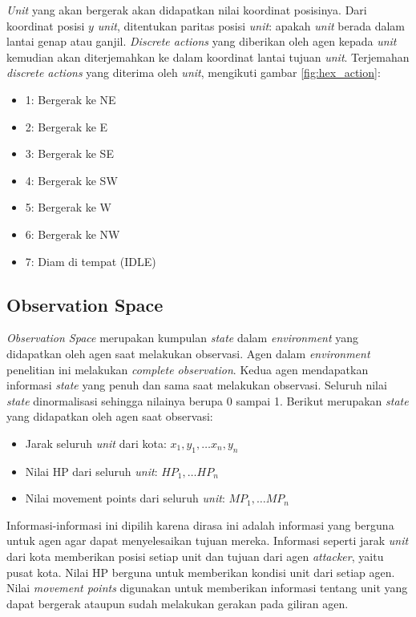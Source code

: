 \emph{Unit} yang akan bergerak akan didapatkan nilai koordinat posisinya.
Dari koordinat posisi $y$ \emph{unit}, ditentukan paritas posisi \emph{unit}: apakah \emph{unit} berada dalam lantai genap atau ganjil.
\emph{Discrete actions} yang diberikan oleh agen kepada \emph{unit} kemudian akan diterjemahkan ke dalam koordinat lantai tujuan \emph{unit}.
Terjemahan \emph{discrete actions} yang diterima oleh \emph{unit}, mengikuti gambar \ref{fig:hex_action}:

\begin{itemize}
  \item 1: Bergerak ke NE
  \item 2: Bergerak ke E
  \item 3: Bergerak ke SE
  \item 4: Bergerak ke SW
  \item 5: Bergerak ke W
  \item 6: Bergerak ke NW
  \item 7: Diam di tempat (IDLE)
\end{itemize}

\subsection{Observation Space}
\emph{Observation Space} merupakan kumpulan \emph{state} dalam \emph{environment} yang didapatkan oleh agen saat melakukan observasi.
Agen dalam \emph{environment} penelitian ini melakukan \emph{complete observation}. 
Kedua agen mendapatkan informasi \emph{state} yang penuh dan sama saat melakukan observasi.
Seluruh nilai \emph{state} dinormalisasi sehingga nilainya berupa 0 sampai 1.
Berikut merupakan \emph{state} yang didapatkan oleh agen saat observasi:
\begin{itemize}
  \item Jarak seluruh \emph{unit} dari kota: $x_{1}, y_{1}, \dots x_{n}, y_{n}$
  \item Nilai HP dari seluruh \emph{unit}: $HP_{1}, \dots HP_{n}$
  \item Nilai movement points dari seluruh \emph{unit}: $MP_{1}, \dots MP_{n}$
\end{itemize}

Informasi-informasi ini dipilih karena dirasa ini adalah informasi yang berguna untuk agen agar dapat menyelesaikan tujuan mereka.
Informasi seperti jarak \emph{unit} dari kota memberikan posisi setiap unit dan tujuan dari agen \emph{attacker}, yaitu pusat kota.
Nilai HP berguna untuk memberikan kondisi unit dari setiap agen.
Nilai \emph{movement points} digunakan untuk memberikan informasi tentang unit yang dapat bergerak ataupun sudah melakukan gerakan pada giliran agen.

